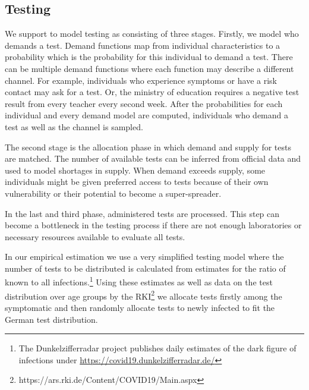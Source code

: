 \subsection{Testing} %
\label{sub:testing}

We support to model testing as consisting of three stages. Firstly, we model who demands
a test. Demand functions map from individual characteristics to a probability which is
the probability for this individual to demand a test. There can be multiple demand
functions where each function may describe a different channel. For example, individuals
who experience symptoms or have a risk contact may ask for a test. Or, the ministry of
education requires a negative test result from every teacher every second week. After
the probabilities for each individual and every demand model are computed, individuals
who demand a test as well as the channel is sampled.

The second stage is the allocation phase in which demand and supply for tests are
matched. The number of available tests can be inferred from official data and used to
model shortages in supply. When demand exceeds supply, some individuals might be given
preferred access to tests because of their own vulnerability or their potential to
become a super-spreader.

In the last and third phase, administered tests are processed. This step can become a
bottleneck in the testing process if there are not enough laboratories or necessary
resources available to evaluate all tests.

In our empirical estimation we use a very simplified testing model where the number of
tests to be distributed is calculated from estimates for the ratio of known to all
infections.\footnote{The Dunkelzifferradar project publishes daily estimates of the dark
figure of infections under \url{https://covid19.dunkelzifferradar.de/}} Using these
estimates as well as data on the test distribution over age groups by the
RKI\footnote{https://ars.rki.de/Content/COVID19/Main.aspx} we allocate tests firstly
among the symptomatic and then randomly allocate tests to newly infected to fit the
German test distribution.


